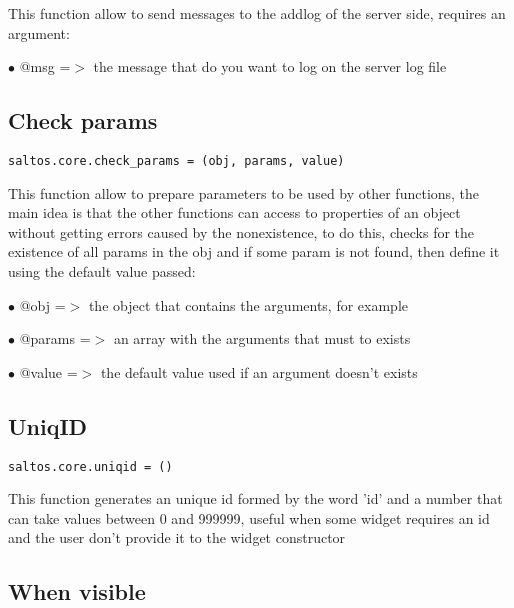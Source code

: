 \documentclass[a4paper]{book}
\begin{document}
This function allow to send messages to the addlog of the server side, requires an argument:

\begin{compactitem}
\item[\color{myblue}$\bullet$] @msg =$>$ the message that do you want to log on the server log file
\end{compactitem}

\hypertarget{toc483}{}
\subsection{Check params}

\begin{lstlisting}
saltos.core.check_params = (obj, params, value)
\end{lstlisting}

This function allow to prepare parameters to be used by other functions, the main idea
is that the other functions can access to properties of an object without getting errors
caused by the nonexistence, to do this, checks for the existence of all params in the obj
and if some param is not found, then define it using the default value passed:

\begin{compactitem}
\item[\color{myblue}$\bullet$] @obj    =$>$ the object that contains the arguments, for example
\item[\color{myblue}$\bullet$] @params =$>$ an array with the arguments that must to exists
\item[\color{myblue}$\bullet$] @value  =$>$ the default value used if an argument doesn't exists
\end{compactitem}

\hypertarget{toc484}{}
\subsection{UniqID}

\begin{lstlisting}
saltos.core.uniqid = ()
\end{lstlisting}

This function generates an unique id formed by the word 'id' and a number that can take
values between 0 and 999999, useful when some widget requires an id and the user don't
provide it to the widget constructor

\hypertarget{toc485}{}
\subsection{When visible}
\end{document}
